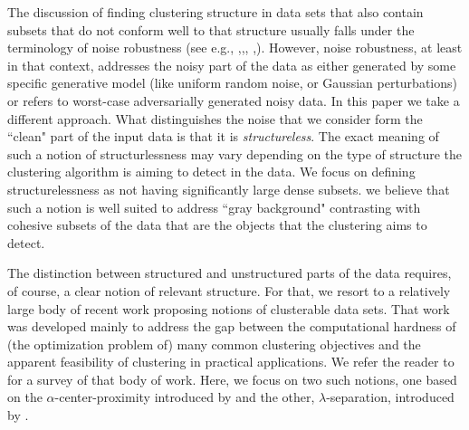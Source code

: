 \documentclass[orivec]{llncs}
\begin{document}
The discussion of finding clustering structure in data sets that also contain subsets that do not conform well to that structure usually falls under the terminology of noise robustness (see e.g., \cite{balcan2012clustering},\cite{ackerman2009clusterability},\cite{dave1993robust}, \cite{cuesta1997trimmed},\cite{garcia2008general}). However, noise robustness, at least in that context, addresses the noisy part of the data as either generated by some specific generative model (like uniform random noise, or Gaussian perturbations) or refers to worst-case adversarially generated noisy data. In this paper we take a different approach. What distinguishes the noise that we consider form the ``clean" part of the input data is that it is \emph{structureless}. The exact meaning of such a notion of structurlessness may vary depending on the type of structure the clustering algorithm is aiming to detect in the data. We focus on defining structurelessness as  not having significantly large dense subsets. we believe that such a notion is well suited to address ``gray background" contrasting with cohesive subsets of the data that are the objects that the clustering aims to detect. 

The distinction between structured and unstructured parts of the data requires, of course, a clear notion of relevant structure. For that, we resort to a relatively large body of recent work proposing notions of clusterable data sets. That work was developed mainly to address the gap between the computational hardness of (the optimization problem of) many common clustering objectives and the apparent feasibility of clustering in practical applications. We refer the reader to \cite{ben2015computational} for a survey of that body of work. Here, we focus on two such notions, one based on the $\alpha$-center-proximity introduced by \cite{awasthi2012center} and the other, $\lambda$-separation, introduced by \cite{ben2014clustering}.
\end{document}
